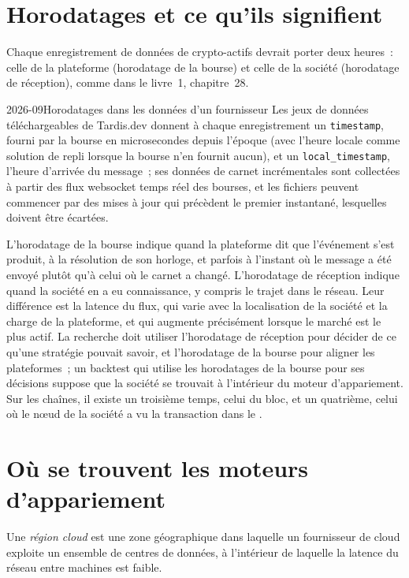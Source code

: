 \section{Horodatages et ce qu'ils signifient}

Chaque enregistrement de données de crypto-actifs devrait porter deux heures~: celle de la plateforme (horodatage de la bourse) et celle de la société (horodatage de réception), comme dans le livre~1, chapitre~28.

\begin{dated}{2026-09}{Horodatages dans les données d'un fournisseur}\label{dat:m3:crypto-data-and-infrastructure:tardis}
Les jeux de données téléchargeables de Tardis.dev donnent à chaque enregistrement un \texttt{timestamp}, fourni par la bourse en microsecondes depuis l'époque (avec l'heure locale comme
solution de repli lorsque la bourse n'en fournit aucun), et un \texttt{local\_timestamp}, l'heure d'arrivée du message~; ses données de carnet incrémentales sont collectées à partir des
flux websocket temps réel des bourses, et les fichiers peuvent commencer par des mises à jour qui précèdent le premier instantané, lesquelles doivent être écartées.
\end{dated}

L'horodatage de la bourse indique quand la plateforme dit que l'événement s'est produit, à la résolution de son horloge, et parfois à l'instant où le message a été envoyé plutôt qu'à celui où le
carnet a changé. L'horodatage de réception indique quand la société en a eu connaissance, y compris le trajet dans le réseau. Leur différence est la latence du flux, qui varie avec la
localisation de la société et la charge de la plateforme, et qui augmente précisément lorsque le marché est le plus actif. La recherche doit utiliser l'horodatage de réception pour décider de ce qu'une stratégie pouvait
savoir, et l'horodatage de la bourse pour aligner les plateformes~; un backtest qui utilise les horodatages de la bourse pour ses décisions suppose que la société se trouvait à l'intérieur du moteur d'appariement. Sur
les chaînes, il existe un troisième temps, celui du bloc, et un quatrième, celui où le nœud de la société a vu la transaction dans le .

\section{Où se trouvent les moteurs d'appariement}

\begin{definition}\label{def:m3:crypto-data-and-infrastructure:region}
Une \emph{région cloud} est une zone géographique dans laquelle un fournisseur de cloud exploite un ensemble de centres de données, à l'intérieur de laquelle la latence du réseau entre
machines est faible.
\end{definition}

